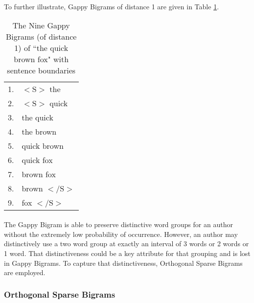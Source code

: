 		To further illustrate, Gappy Bigrams of distance 1 are given in Table \ref{table:1gappybigrams}.
		
		\begin{center}
			\begin{table}[h]
				\begin{center}
					\begin{tabular}{ r l }
					1. & $<\text{S}>$ the\\
					2. & $<\text{S}>$ quick\\
					3. & the quick\\
					4. & the brown\\
					5. & quick brown\\
					6. & quick fox\\
					7. & brown fox\\
					8. & brown $<\text{/S}>$\\
					9. & fox $<\text{/S}>$\\
					\end{tabular}
					\caption{The Nine Gappy Bigrams (of distance 1) of ``the quick brown fox" with sentence boundaries}
					\label{table:1gappybigrams}
				\end{center}
			\end{table}
		\end{center}

		\paragraph{}  The Gappy Bigram is able to preserve distinctive word groups for an author without the extremely low probability of occurrence.  However, an author may distinctively use a two word group at exactly an interval of 3 words or 2 words or 1 word.  That distinctiveness could be a key attribute for that grouping and is lost in Gappy Bigrams.  To capture that distinctiveness, Orthogonal Sparse Bigrams are employed.

	\subsubsection{Orthogonal Sparse Bigrams}
